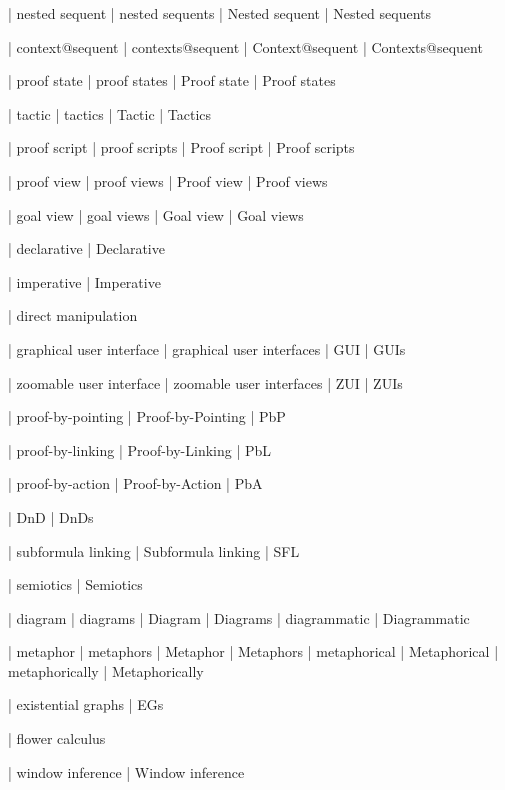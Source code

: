  | nested sequent
 | nested sequents
 | Nested sequent
 | Nested sequents

 | context@sequent
 | contexts@sequent
 | Context@sequent
 | Contexts@sequent

 | proof state
 | proof states
 | Proof state
 | Proof states

 | tactic
 | tactics
 | Tactic
 | Tactics

 | proof script
 | proof scripts
 | Proof script
 | Proof scripts

 | proof view
 | proof views
 | Proof view
 | Proof views

 | goal view
 | goal views
 | Goal view
 | Goal views

 | declarative
 | Declarative

 | imperative
 | Imperative

 | direct manipulation

 | graphical user interface
 | graphical user interfaces
 | GUI
 | GUIs

 | zoomable user interface
 | zoomable user interfaces
 | ZUI
 | ZUIs

 | proof-by-pointing
 | Proof-by-Pointing
 | PbP

 | proof-by-linking
 | Proof-by-Linking
 | PbL

 | proof-by-action
 | Proof-by-Action
 | PbA

 | DnD
 | DnDs

 | subformula linking
 | Subformula linking
 | SFL

 | semiotics
 | Semiotics

 | diagram
 | diagrams
 | Diagram
 | Diagrams
 | diagrammatic
 | Diagrammatic

 | metaphor
 | metaphors
 | Metaphor
 | Metaphors
 | metaphorical
 | Metaphorical
 | metaphorically
 | Metaphorically

 | existential graphs
 | EGs

 | flower calculus
 
 | window inference
 | Window inference

